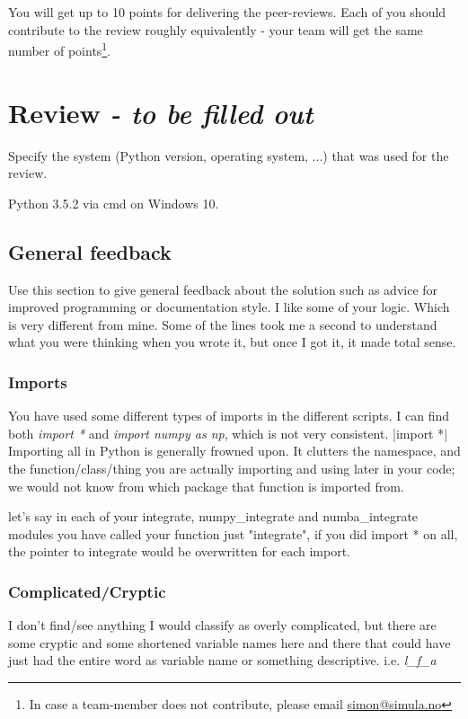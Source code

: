 \documentclass[a4paper]{article}
\begin{document}
You will get up to 10 points for delivering the peer-reviews. Each of you should contribute to the review roughly equivalently - your team will get the same number of points\footnote{In case a team-member does not contribute, please email \href{mailto:simon@simula.no}{simon@simula.no}}. 



\section{Review \emph{- to be filled out}}\label{sec:review}

Specify the system (Python version, operating system, ...) that was used for the review.

Python 3.5.2 via cmd on Windows 10.

\subsection*{General feedback}
Use this section to give general feedback about the solution such as advice for improved programming or documentation style.
\newline
I like some of your logic. Which is very different from mine.
Some of the lines took me a second to understand what you were thinking when you wrote it, but once I got it, it made total sense.

\subsubsection*{Imports}
You have used some different types of imports in the different scripts.
I can find both \emph{import *} and \emph{import numpy as np}, which is not very consistent.
\newline
{}|import *|
Importing all in Python is generally frowned upon.
It clutters the namespace, and the function/class/thing you are actually importing and using later in your code; we would not know from which package that function is imported from.

let's say in each of your integrate, numpy\_integrate and numba\_integrate modules you have called your function just "integrate", if you did import * on all, the pointer to integrate would be overwritten for each import.
\subsubsection*{Complicated/Cryptic}
I don't find/see anything I would classify as overly complicated, but there are some cryptic and some shortened variable names here and there that could have just had the entire word as variable name or something descriptive. i.e. \emph{l\_f\_a}
\end{document}
